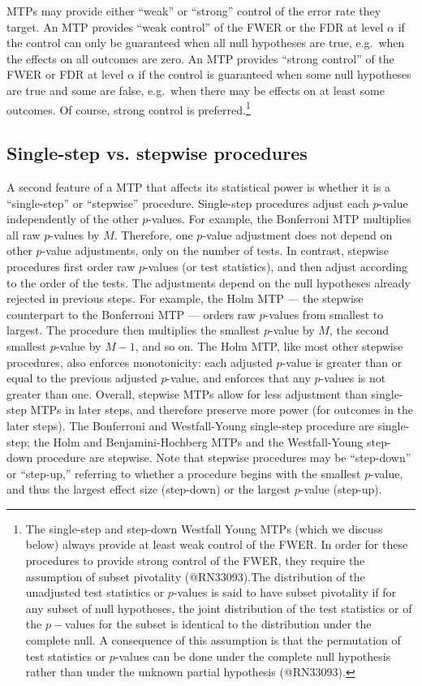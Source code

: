 \documentclass[
]{article}
\begin{document}
MTPs may provide either ``weak'' or ``strong'' control of the error rate
they target. An MTP provides ``weak control'' of the FWER or the FDR at
level \(\alpha\) if the control can only be guaranteed when all null
hypotheses are true, e.g.~when the effects on all outcomes are zero. An
MTP provides ``strong control'' of the FWER or FDR at level \(\alpha\)
if the control is guaranteed when some null hypotheses are true and some
are false, e.g.~when there may be effects on at least some outcomes. Of
course, strong control is
preferred.\footnote{The single-step and step-down Westfall Young MTPs (which we discuss below) always provide at least weak control of the FWER. In order for these procedures to provide strong control of the FWER, they require the assumption of subset pivotality (@RN33093).The distribution of the unadjusted test statistics or $p$-values is said to have subset pivotality if for any subset of null hypotheses, the joint distribution of the test statistics or of the $p-$values for the subset is identical to the distribution under the complete null.
A consequence of this assumption is that the permutation of test statistics or $p$-values can be done under the complete null hypothesis rather than under the unknown partial hypothesis (@RN33093).}

\subsection{Single-step vs. stepwise procedures}
\label{sec:stepwise}

A second feature of a MTP that affects its statistical power is whether
it is a ``single-step'' or ``stepwise'' procedure. Single-step
procedures adjust each \(p\)-value independently of the other
\(p\)-values. For example, the Bonferroni MTP multiplies all raw
\(p\)-values by \(M\). Therefore, one \(p\)-value adjustment does not
depend on other \(p\)-value adjustments, only on the number of tests. In
contrast, stepwise procedures first order raw \(p\)-values (or test
statistics), and then adjust according to the order of the tests. The
adjustments depend on the null hypotheses already rejected in previous
steps. For example, the Holm MTP --- the stepwise counterpart to the
Bonferroni MTP --- orders raw \(p\)-values from smallest to largest. The
procedure then multiplies the smallest \(p\)-value by \(M\), the second
smallest \(p\)-value by \(M-1\), and so on. The Holm MTP, like most
other stepwise procedures, also enforces monotonicity: each adjusted
\(p\)-value is greater than or equal to the previous adjusted
\(p\)-value, and enforces that any \(p\)-values is not greater than one.
Overall, stepwise MTPs allow for less adjustment than single-step MTPs
in later steps, and therefore preserve more power (for outcomes in the
later steps). The Bonferroni and Westfall-Young single-step procedure
are single-step; the Holm and Benjamini-Hochberg MTPs and the
Westfall-Young step-down procedure are stepwise. Note that stepwise
procedures may be ``step-down'' or ``step-up,'' referring to whether a
procedure begins with the smallest \(p\)-value, and thus the largest
effect size (step-down) or the largest \(p\)-value (step-up).
\end{document}
